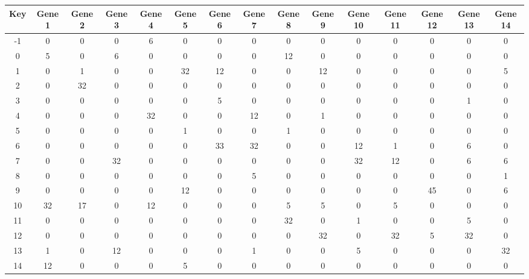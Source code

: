 \begin{tabular}{|c|c|c|c|c|c|c|c|c|c|c|c|c|c|c|}
\hline
Key & Gene 1 & Gene 2 & Gene 3 & Gene 4 & Gene 5 & Gene 6 & Gene 7 & Gene 8 & Gene 9 & Gene 10 & Gene 11 & Gene 12 & Gene 13 & Gene 14 \\
\hline
-1 & 0 & 0 & 0 & 6 & 0 & 0 & 0 & 0 & 0 & 0 & 0 & 0 & 0 & 0 \\
0 & 5 & 0 & 6 & 0 & 0 & 0 & 0 & 12 & 0 & 0 & 0 & 0 & 0 & 0 \\
1 & 0 & 1 & 0 & 0 & 32 & 12 & 0 & 0 & 12 & 0 & 0 & 0 & 0 & 5 \\
2 & 0 & 32 & 0 & 0 & 0 & 0 & 0 & 0 & 0 & 0 & 0 & 0 & 0 & 0 \\
3 & 0 & 0 & 0 & 0 & 0 & 5 & 0 & 0 & 0 & 0 & 0 & 0 & 1 & 0 \\
4 & 0 & 0 & 0 & 32 & 0 & 0 & 12 & 0 & 1 & 0 & 0 & 0 & 0 & 0 \\
5 & 0 & 0 & 0 & 0 & 1 & 0 & 0 & 1 & 0 & 0 & 0 & 0 & 0 & 0 \\
6 & 0 & 0 & 0 & 0 & 0 & 33 & 32 & 0 & 0 & 12 & 1 & 0 & 6 & 0 \\
7 & 0 & 0 & 32 & 0 & 0 & 0 & 0 & 0 & 0 & 32 & 12 & 0 & 6 & 6 \\
8 & 0 & 0 & 0 & 0 & 0 & 0 & 5 & 0 & 0 & 0 & 0 & 0 & 0 & 1 \\
9 & 0 & 0 & 0 & 0 & 12 & 0 & 0 & 0 & 0 & 0 & 0 & 45 & 0 & 6 \\
10 & 32 & 17 & 0 & 12 & 0 & 0 & 0 & 5 & 5 & 0 & 5 & 0 & 0 & 0 \\
11 & 0 & 0 & 0 & 0 & 0 & 0 & 0 & 32 & 0 & 1 & 0 & 0 & 5 & 0 \\
12 & 0 & 0 & 0 & 0 & 0 & 0 & 0 & 0 & 32 & 0 & 32 & 5 & 32 & 0 \\
13 & 1 & 0 & 12 & 0 & 0 & 0 & 1 & 0 & 0 & 5 & 0 & 0 & 0 & 32 \\
14 & 12 & 0 & 0 & 0 & 5 & 0 & 0 & 0 & 0 & 0 & 0 & 0 & 0 & 0 \\
\hline
\end{tabular}